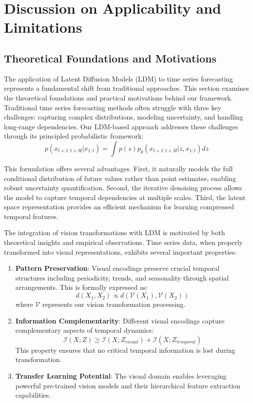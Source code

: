 \section{Discussion on Applicability and Limitations}
\label{appx:discussion}

\subsection{Theoretical Foundations and Motivations}
The application of Latent Diffusion Models (LDM) to time series forecasting represents a fundamental shift from traditional approaches. This section examines the theoretical foundations and practical motivations behind our framework. Traditional time series forecasting methods often struggle with three key challenges: capturing complex distributions, modeling uncertainty, and handling long-range dependencies. Our LDM-based approach addresses these challenges through its principled probabilistic framework:
\begin{equation}
p(x_{t+1:t+H}|x_{1:t}) = \int p(z)p_\theta(x_{t+1:t+H}|z,x_{1:t})dz
\end{equation}

This formulation offers several advantages. First, it naturally models the full conditional distribution of future values rather than point estimates, enabling robust uncertainty quantification. Second, the iterative denoising process allows the model to capture temporal dependencies at multiple scales. Third, the latent space representation provides an efficient mechanism for learning compressed temporal features.

The integration of vision transformations with LDM is motivated by both theoretical insights and empirical observations. Time series data, when properly transformed into visual representations, exhibits several important properties:

\begin{enumerate}
\item \textbf{Pattern Preservation}: Visual encodings preserve crucial temporal structures including periodicity, trends, and seasonality through spatial arrangements. This is formally expressed as:
\begin{equation}
d(X_1, X_2) \propto d(\mathcal{V}(X_1), \mathcal{V}(X_2))
\end{equation}
where $\mathcal{V}$ represents our vision transformation processing.

\item \textbf{Information Complementarity}: Different visual encodings capture complementary aspects of temporal dynamics:
\begin{equation}
\mathcal{I}(X;Z) \geq \mathcal{I}(X;Z_{visual}) + \mathcal{I}(X;Z_{temporal})
\end{equation}
This property ensures that no critical temporal information is lost during transformation.

\item \textbf{Transfer Learning Potential}: The visual domain enables leveraging powerful pre-trained vision models and their hierarchical feature extraction capabilities.
\end{enumerate}

